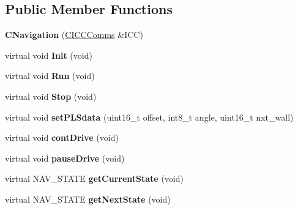\subsection*{Public Member Functions}
\begin{DoxyCompactItemize}
\item 
\mbox{\label{class_c_navigation_a0527efabaf4644c8c4e7910efec36e82}} 
{\bfseries C\+Navigation} (\mbox{\hyperlink{class_c_i_c_c_comms}{C\+I\+C\+C\+Comms}} \&I\+CC)
\item 
\mbox{\label{class_c_navigation_a86a0756663ccf76e9c474764b8f7a04f}} 
virtual void {\bfseries Init} (void)
\item 
\mbox{\label{class_c_navigation_a86acb1521aab400e542465c8eabed671}} 
virtual void {\bfseries Run} (void)
\item 
\mbox{\label{class_c_navigation_a3cc8f7fdd003d6b2c5056b87ff93edd9}} 
virtual void {\bfseries Stop} (void)
\item 
\mbox{\label{class_c_navigation_a53f0409677e36f62ef232f7e15b32948}} 
virtual void {\bfseries set\+P\+L\+Sdata} (uint16\+\_\+t offset, int8\+\_\+t angle, uint16\+\_\+t nxt\+\_\+wall)
\item 
\mbox{\label{class_c_navigation_abc7e30f72ee2cb33be7b0949efe1cb18}} 
virtual void {\bfseries cont\+Drive} (void)
\item 
\mbox{\label{class_c_navigation_a27649dc6324360829d42aea67e88e3ee}} 
virtual void {\bfseries pause\+Drive} (void)
\item 
\mbox{\label{class_c_navigation_a42982842952ac5340b54f43a661673f4}} 
virtual N\+A\+V\+\_\+\+S\+T\+A\+TE {\bfseries get\+Current\+State} (void)
\item 
\mbox{\label{class_c_navigation_afef253f37646558a755d956ecf2fc6e9}} 
virtual N\+A\+V\+\_\+\+S\+T\+A\+TE {\bfseries get\+Next\+State} (void)
\item 
\mbox{\label{class_c_navigation_ac491c77788ba2e953a704b6ad622a665}} 

\end{DoxyCompactItemize}

